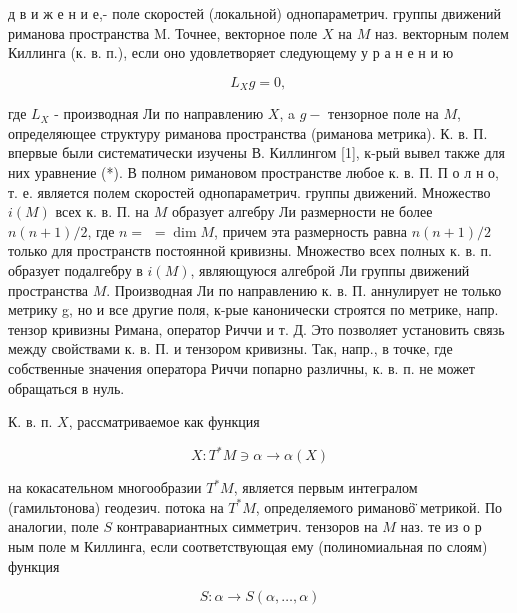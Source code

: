 \documentclass[10pt]{article}
\begin{document}
д в и ж е н и е,- поле скоростей (локальной) однопараметрич. группы движений риманова пространства M. Точнее, векторное поле $X$ на $M$ наз. векторным полем Киллинга (к. в. п.), если оно удовлетворяет следующему у р а н е н и ю



\[

L_{X} g=0 \text {, }

\]



где $L_{X}$ - производная Ли по направлению $X$, a $g-$ тензорное поле на $M$, определяющее структуру риманова пространства (риманова метрика). К. в. П. впервые были систематически изучены В. Киллингом [1], к-рыӥ вывел также для них уравнение (*). В полном римановом пространстве любое к. в. П. П о л н о, т. е. является полем скоростей однопараметрич. группы движений. Множество $i(M)$ всех к. в. П. на $M$ образует алгебру Ли размерности не более $n(n+1) / 2$, где $n=$ $=\operatorname{dim} M$, причем эта размерность равна $n(n+1) / 2$ только для пространств постоянной кривизны. Множество всех полных к. в. п. образует подалгебру в $i(M)$, являющуюся алгеброй Ли группы движений пространства $M$. Производная Ли по направлению к. в. П. аннулирует не только метрику g, но и все другие поля, к-рые канонически строятся по метрике, напр. тензор кривизны Римана, оператор Риччи и т. Д. Это позволяет установить связь между свойствами к. в. П. и тензором кривизны. Так, напр., в точке, где собственные значения оператора Риччи попарно различны, к. в. п. не может обращаться в нуль.



К. в. п. $X$, рассматриваемое как функция



\[

X: T^{*} M \ni \alpha \longrightarrow \alpha(X)

\]



на кокасательном многообразии $T^{*} M$, является первым интегралом (гамильтонова) геодезич. потока на $T^{*} M$, определяемого римановӧ̈ метрикой. По аналогии, поле $S$ контравариантных симметрич. тензоров на $M$ наз. те из о р ным поле м Киллинга, если соответствующая ему (полиномиальная по слоям) функция



\[

S: \alpha \rightarrow S(\alpha, \ldots, \alpha)

\]
\end{document}
